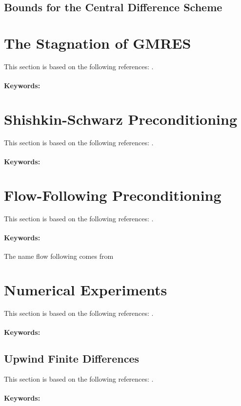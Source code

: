 \subsection{Bounds for the Central Difference Scheme}


\section{The Stagnation of GMRES}
This section is based on the following references: \cite{Gal13, GolVan13, HorJoh12, Saa03}.
\paragraph{Keywords:}


\section{Shishkin-Schwarz Preconditioning}
This section is based on the following references: \cite{KahKamPhi07}.
\paragraph{Keywords:}


\section{Flow-Following Preconditioning}
This section is based on the following references: \cite{ElmSilWat14}.
\paragraph{Keywords:} The name flow following comes from \cite{AndKop96}


\section{Numerical Experiments}
This section is based on the following references: \cite{ElmSilWat14}.
\paragraph{Keywords:}

\subsection{Upwind Finite Differences}
This section is based on the following references: \cite{EchLieSzyTic18, Smi85}.
\paragraph{Keywords:}


